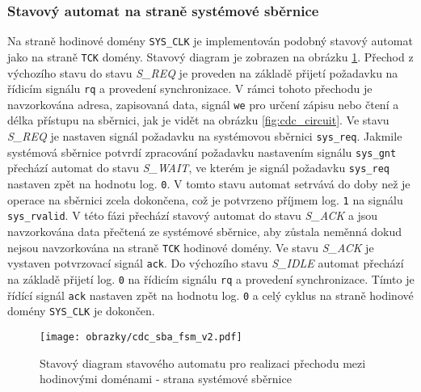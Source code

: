 \subsubsection{Stavový automat na straně systémové sběrnice}
Na straně hodinové domény \texttt{SYS\_CLK} je implementován podobný stavový automat jako na straně \texttt{\acs{TCK}} domény. Stavový diagram je zobrazen na obrázku \ref{fig:cdc_sba_fsm}. Přechod z výchozího stavu do stavu \textit{S\_REQ} je proveden na základě přijetí požadavku na řídicím signálu \texttt{rq} a provedení synchronizace. V rámci tohoto přechodu je navzorkována adresa, zapisovaná data, signál \texttt{we} pro určení zápisu nebo čtení a délka přístupu na sběrnici, jak je vidět na obrázku \ref{fig:cdc_circuit}. Ve stavu \textit{S\_REQ} je nastaven signál požadavku na systémovou sběrnici \texttt{sys\_req}. Jakmile systémová sběrnice potvrdí zpracování požadavku nastavením signálu \texttt{sys\_gnt} přechází automat do stavu \textit{S\_WAIT}, ve kterém je signál požadavku \texttt{sys\_req} nastaven zpět na hodnotu log. \texttt{0}. V tomto stavu automat setrvává do doby než je operace na sběrnici zcela dokončena, což je potvrzeno příjmem log. \texttt{1} na signálu \texttt{sys\_rvalid}. V této fázi přechází stavový automat do stavu \textit{S\_ACK} a jsou navzorkována data přečtená ze systémové sběrnice, aby zůstala neměnná dokud nejsou navzorkována na straně \texttt{\acs{TCK}} hodinové domény. Ve stavu \textit{S\_ACK} je vystaven potvrzovací signál \texttt{ack}. Do výchozího stavu \textit{S\_IDLE} automat přechází na základě přijetí log. \texttt{0} na řídicím signálu \texttt{rq} a provedení synchronizace. Tímto je řídící signál \texttt{ack} nastaven zpět na hodnotu log. \texttt{0} a celý cyklus na straně hodinové domény \texttt{SYS\_CLK} je dokončen.

\begin{figure}[H]
  \begin{center}
    \texttt{[image: obrazky/cdc\_sba\_fsm\_v2.pdf]}
  \end{center}
  \caption{Stavový diagram stavového automatu pro realizaci přechodu mezi hodinovými doménami - strana systémové sběrnice}
	\label{fig:cdc_sba_fsm}
\end{figure}